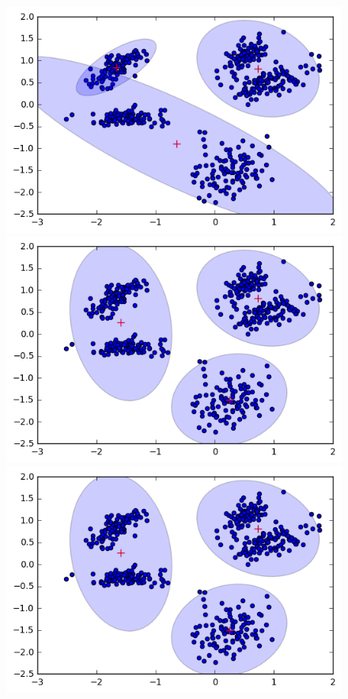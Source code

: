\documentclass[a4paper,11pt]{article}
\begin{document}
\begin{figure}[htbp]
  \includegraphics[scale=0.2]{k3nk4.png}
  \includegraphics[scale=0.2]{k3nk5.png}
  \includegraphics[scale=0.2]{k3nk6.png}

\end{figure}
\end{document}
